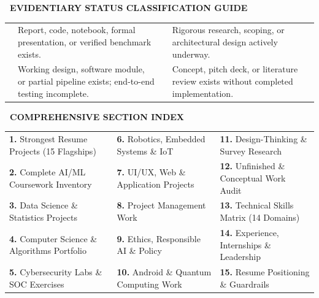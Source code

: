 \documentclass[10pt,a4paper]{article}
\newcommand{\statuscompleted}{\tcbox[on line, colback=completedbg, colframe=completed!50!white, size=small, arc=2pt, boxrule=0.5pt]{\scriptsize\bfseries\color{completed}\faIcon{check-circle}\ COMPLETED / SUBSTANTIAL}}
\newcommand{\statusprogress}{\tcbox[on line, colback=progressbg, colframe=progress!50!white, size=small, arc=2pt, boxrule=0.5pt]{\scriptsize\bfseries\color{progress}\faIcon{spinner}\ IN PROGRESS}}
\newcommand{\statusprototype}{\tcbox[on line, colback=prototypebg, colframe=prototype!50!white, size=small, arc=2pt, boxrule=0.5pt]{\scriptsize\bfseries\color{prototype}\faIcon{flask}\ PROTOTYPE / PARTIAL}}
\newcommand{\statusconcept}{\tcbox[on line, colback=conceptbg, colframe=concept!50!white, size=small, arc=2pt, boxrule=0.5pt]{\scriptsize\bfseries\color{concept}\faIcon{lightbulb}\ CONCEPT / RESEARCH ONLY}}
\begin{document}
\begin{tcolorbox}[enhanced, colback=lightbg, colframe=cardborder, boxrule=0.5pt, arc=3pt, left=8pt, right=8pt, top=6pt, bottom=6pt, after skip=8pt]
  {\footnotesize\bfseries\color{primary}\ EVIDENTIARY STATUS CLASSIFICATION GUIDE}\\[4pt]
  \begin{tabularx}{\textwidth}{@{}lXlX@{}}
    \statuscompleted & {\scriptsize Report, code, notebook, formal presentation, or verified benchmark exists.} &
    \statusprogress & {\scriptsize Rigorous research, scoping, or architectural design actively underway.} \\
    \statusprototype & {\scriptsize Working design, software module, or partial pipeline exists; end-to-end testing incomplete.} &
    \statusconcept & {\scriptsize Concept, pitch deck, or literature review exists without completed implementation.}
  \end{tabularx}
\end{tcolorbox}

\begin{tcolorbox}[enhanced, colback=white, colframe=cardborder, boxrule=0.5pt, arc=3pt, left=8pt, right=8pt, top=6pt, bottom=6pt]
  {\footnotesize\bfseries\color{primary}\ COMPREHENSIVE SECTION INDEX}\\[3pt]
  \begin{tabularx}{\textwidth}{@{}XXX@{}}
    {\scriptsize\textbf{1.} Strongest Resume Projects (15 Flagships)} &
    {\scriptsize\textbf{6.} Robotics, Embedded Systems \& IoT} &
    {\scriptsize\textbf{11.} Design-Thinking \& Survey Research} \\
    {\scriptsize\textbf{2.} Complete AI/ML Coursework Inventory} &
    {\scriptsize\textbf{7.} UI/UX, Web \& Application Projects} &
    {\scriptsize\textbf{12.} Unfinished \& Conceptual Work Audit} \\
    {\scriptsize\textbf{3.} Data Science \& Statistics Projects} &
    {\scriptsize\textbf{8.} Project Management Work} &
    {\scriptsize\textbf{13.} Technical Skills Matrix (14 Domains)} \\
    {\scriptsize\textbf{4.} Computer Science \& Algorithms Portfolio} &
    {\scriptsize\textbf{9.} Ethics, Responsible AI \& Policy} &
    {\scriptsize\textbf{14.} Experience, Internships \& Leadership} \\
    {\scriptsize\textbf{5.} Cybersecurity Labs \& SOC Exercises} &
    {\scriptsize\textbf{10.} Android \& Quantum Computing Work} &
    {\scriptsize\textbf{15.} Resume Positioning \& Guardrails}
  \end{tabularx}
\end{tcolorbox}
\end{document}
